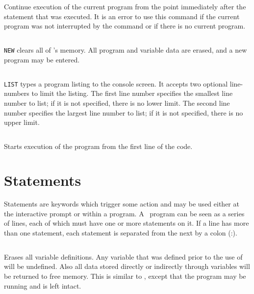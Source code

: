 \documentclass{article}
\begin{document}
    Continue execution of the current program from the point immediately after the  statement that was executed.
    It is an error to use this command if the current program was not interrupted by the  command or if there
    is no current program.

    \subsection{}

    \verb+NEW+ clears all of \BASIC's memory. All program and variable data are erased, and a new program may be entered.

    \subsection{}

    \verb+LIST+ types a program listing to the console screen. It accepts two optional line-numbers to limit the listing.
    The first line number specifies the smallest line number to list; if it is not specified, there is no lower limit.
    The second line number specifies the largest line number to list; if it is not specified, there is no upper limit.

    \subsection{}

    Starts execution of the program from the first line of the code.


    \section{Statements}

    Statements are keywords which trigger some action and may be used either at the interactive prompt or within a program.
    A \BASIC\ program can be seen as a series of lines, each of which must have one or more statements on it.
    If a line has more than one statement, each statement is separated from the next by a colon (:).

    \subsection{}

    Erases all variable definitions. Any variable that was defined prior to the use of  will be undefined.
    Also all data stored directly or indirectly through variables will be returned to free memory. This is similar to
    , except that the program may be running and is left intact.
\end{document}
